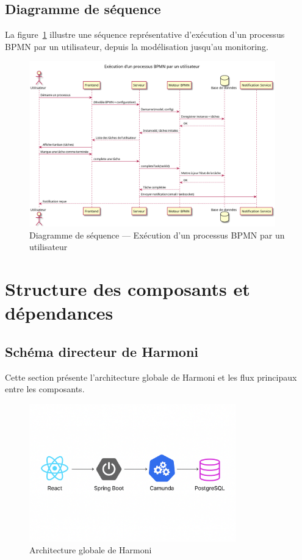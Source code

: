 \subsection{Diagramme de séquence}
La figure~\ref{fig:seq_exec_bpmn} illustre une séquence représentative d'exécution d'un processus BPMN par un utilisateur, depuis la modélisation jusqu’au monitoring.
\begin{figure}[h]
    \centering
    \includegraphics[width=0.95\textwidth]{Images/sequence.png}
    \caption{Diagramme de séquence — Exécution d’un processus BPMN par un utilisateur}
    \label{fig:seq_exec_bpmn}
\end{figure}

\section{Structure des composants et dépendances}

\subsection{Schéma directeur de Harmoni}
Cette section présente l'architecture globale de Harmoni et les flux principaux entre les composants.
\begin{figure}[h]
    \centering
    \includegraphics[width=0.8\textwidth]{Images/Architecture.png}
    \caption{Architecture globale de Harmoni}
    \label{fig:harmoni_global_architecture}
\end{figure}

